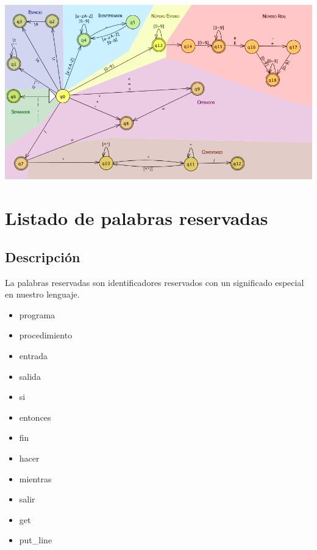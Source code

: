          \hspace{-7.8em}\includegraphics[scale=.61]{../Design/jflap/automata.png}

            \hfill
            \clearpage


 
\section{Listado de palabras reservadas}
    
        \subsection{Descripción}
        
        La palabras reservadas son identificadores reservados con un significado especial en nuestro lenguaje.
        
        \begin{itemize}
             \item programa
             \item procedimiento
             \item entrada
             \item salida
             \item si
             \item entonces
             \item fin
             \item hacer
             \item mientras
             \item salir
             \item get
             \item put\_line
       \end{itemize}

       \hfill
       \clearpage




